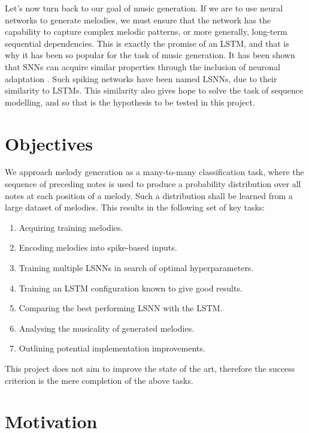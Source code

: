\documentclass[../../report.tex]{subfiles}
\begin{document}
Let's now turn back to our goal of music generation. If we are to use neural
networks to generate melodies, we must ensure that the network has the
capability to capture complex melodic patterns, or more generally, long-term
sequential dependencies. This is exactly the promise of an LSTM, and that is why
it has been so popular for the task of music generation. It has been shown that
SNNs can acquire similar properties through the inclusion of neuronal adaptation
\cite{Bellec2018LSNN}. Such spiking networks have been named LSNNs, due to their
similarity to LSTMs. This similarity also gives hope to solve the task of
sequence modelling, and so that is the hypothesis to be tested in this project.

\section{Objectives}

We approach melody generation as a many-to-many classification task, where the
sequence of preceding notes is used to produce a probability distribution over
all notes at each position of a melody. Such a distribution shall be learned
from a large dataset of melodies. This results in the following set of key
tasks:

\begin{enumerate}
  \item Acquiring training melodies.
  \item Encoding melodies into spike-based inputs.
  \item Training multiple LSNNs in search of optimal hyperparameters.
  \item Training an LSTM configuration known to give good results.
  \item Comparing the best performing LSNN with the LSTM.
  \item Analysing the musicality of generated melodies.
  \item Outlining potential implementation improvements.
\end{enumerate}

This project does not aim to improve the state of the art, therefore the success
criterion is the mere completion of the above tasks.

\section{Motivation}
\end{document}
